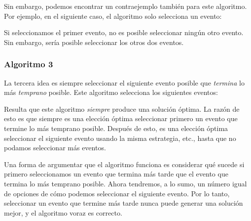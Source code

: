 Sin embargo, podemos encontrar un contraejemplo
también para este algoritmo.
Por ejemplo, en el siguiente caso,
el algoritmo solo selecciona un evento:
\begin{center}
\end{center}
Si seleccionamos el primer evento, no es posible
seleccionar ningún otro evento.
Sin embargo, sería posible seleccionar los
otros dos eventos.

\subsubsection*{Algoritmo 3}

La tercera idea es siempre seleccionar el siguiente
evento posible que \emph{termina} lo más \emph{temprano} posible.
Este algoritmo selecciona los siguientes eventos:
\begin{center}
\end{center}

Resulta que este algoritmo
\emph{siempre} produce una solución óptima.
La razón de esto es que siempre es una elección óptima
seleccionar primero un evento que termine
lo más temprano posible.
Después de esto, es una elección óptima
seleccionar el siguiente evento
usando la misma estrategia, etc.,
hasta que no podamos seleccionar más eventos.

Una forma de argumentar que el algoritmo funciona
es considerar
qué sucede si primero seleccionamos un evento
que termina más tarde que el evento que termina
lo más temprano posible.
Ahora tendremos, a lo sumo, un número igual de
opciones de cómo podemos seleccionar el siguiente evento.
Por lo tanto, seleccionar un evento que termine más tarde
nunca puede generar una solución mejor,
y el algoritmo voraz es correcto.

